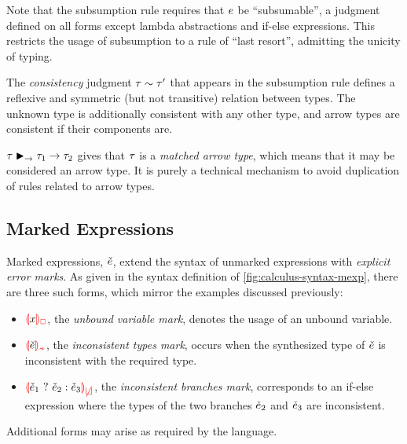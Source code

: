 Note that the subsumption rule requires that $e$ be ``subsumable'', a judgment defined on all
forms except lambda abstractions and if-else expressions. This restricts the usage of subsumption to
a rule of ``last resort'', admitting the unicity of typing.




The \emph{consistency} judgment $\tau \sim \tau'$ that appears in the subsumption rule
defines a reflexive and symmetric (but not transitive) relation between types. The unknown type is
additionally consistent with any other type, and arrow types are consistent if their components are.

$\tau \blacktriangleright_{\to} \tau_1 \to \tau_2$ gives that $\tau$ is a \emph{matched arrow type}, which means
that it may be considered an arrow type. It is purely a technical mechanism to avoid duplication of
rules related to arrow types.



\subsection{Marked Expressions}
\label{sec:calculus-mexp}

Marked expressions, $\check{e}$, extend the syntax of unmarked expressions with \emph{explicit error
marks}. As given in the syntax definition of \cref{fig:calculus-syntax-mexp}, there are three such
forms, which mirror the examples discussed previously:
%
\begin{itemize} %
  \item $\ECUnbound{x}$, the \emph{unbound variable mark}, denotes the usage of an unbound variable.

  \item $\ECInconType{\ECMV}$, the \emph{inconsistent types mark}, occurs when the synthesized type
    of $\check{e}$ is inconsistent with the required type.

  \item $\ECInconBr{\ECMV_1}{\ECMV_2}{\ECMV_3}$, the \emph{inconsistent branches mark}, corresponds
    to an if-else expression where the types of the two branches $\check{e}_2$ and $\check{e}_3$ are
    inconsistent.
\end{itemize}
%
Additional forms may arise as required by the language.

